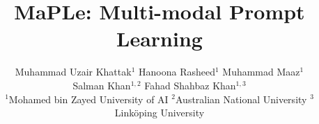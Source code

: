 \documentclass[10pt,twocolumn,letterpaper]{article}
\begin{document}
\title{{MaPLe}: \textbf{M}ulti-mod\textbf{a}l \textbf{P}rompt \textbf{Le}arning}



 \author{
  Muhammad Uzair Khattak$^{1}$ \quad 
  Hanoona Rasheed$^{1}$ \quad 
  Muhammad Maaz$^{1}$ \\
  Salman Khan$^{1,2}$ \quad
  Fahad Shahbaz Khan$^{1,3}$
  \vspace{0.2em} \\
  $^{1}$Mohamed bin Zayed University of AI \quad 
  $^{2}$Australian National University \quad 
  $^{3}$Link\"{o}ping University
}
\end{document}
